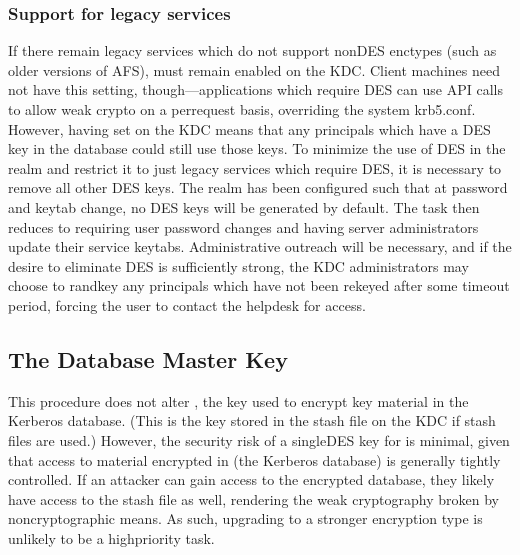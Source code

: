 \documentclass[letterpaper,10pt,english]{sphinxmanual}
\begin{document}
\subsubsection{Support for legacy services}
\label{\detokenize{admin/advanced/retiring-des:support-for-legacy-services}}
\sphinxAtStartPar
If there remain legacy services which do not support non\sphinxhyphen{}DES enctypes
(such as older versions of AFS),  must remain
enabled on the KDC.  Client machines need not have this setting,
though—applications which require DES can use API calls to allow
weak crypto on a per\sphinxhyphen{}request basis, overriding the system krb5.conf.
However, having  set on the KDC means that any
principals which have a DES key in the database could still use those
keys.  To minimize the use of DES in the realm and restrict it to just
legacy services which require DES, it is necessary to remove all other
DES keys.  The realm has been configured such that at password and
keytab change, no DES keys will be generated by default.  The task
then reduces to requiring user password changes and having server
administrators update their service keytabs.  Administrative outreach
will be necessary, and if the desire to eliminate DES is sufficiently
strong, the KDC administrators may choose to randkey any principals
which have not been rekeyed after some timeout period, forcing the
user to contact the helpdesk for access.


\subsection{The Database Master Key}
\label{\detokenize{admin/advanced/retiring-des:the-database-master-key}}
\sphinxAtStartPar
This procedure does not alter , the key used to encrypt key
material in the Kerberos database.  (This is the key stored in the stash file
on the KDC if stash files are used.)  However, the security risk of
a single\sphinxhyphen{}DES key for  is minimal, given that access to material
encrypted in  (the Kerberos database) is generally tightly controlled.
If an attacker can gain access to the encrypted database, they likely
have access to the stash file as well, rendering the weak cryptography
broken by non\sphinxhyphen{}cryptographic means.  As such, upgrading  to a stronger
encryption type is unlikely to be a high\sphinxhyphen{}priority task.
\end{document}
